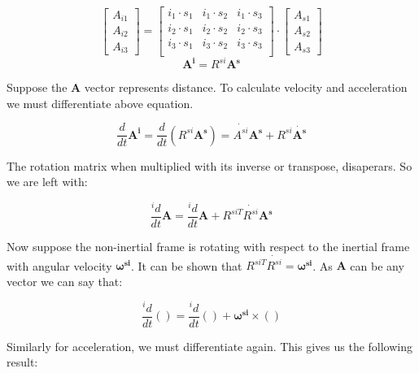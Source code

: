 \documentclass[12pt, letterpaper]{article}
\begin{document}
\begin{displaymath}
	\begin{bmatrix} A_{i1} \\ A_{i2} \\ A_{i3} \end{bmatrix} 
	=
	\begin{bmatrix}
	i_{1} \cdot s_{1} & i_{1} \cdot s_{2} & i_{1} \cdot s_{3}\\
	i_{2} \cdot s_{1} & i_{2} \cdot s_{2} & i_{2} \cdot s_{3}\\
	i_{3} \cdot s_{1} & i_{3} \cdot s_{2} & i_{3} \cdot s_{3}\\
	\end{bmatrix}
	\cdot
	\begin{bmatrix}
	A_{s1} \\ A_{s2} \\ A_{s3}
	\end{bmatrix}
\end{displaymath}
\begin{displaymath}	\mathbf{A^i} = R^{si}\mathbf{A^s} \end{displaymath}

Suppose the $\mathbf{A}$ vector represents distance. To calculate velocity and acceleration we must differentiate above equation. 

\begin{displaymath}
\frac{d}{dt}\mathbf{A^i} = \frac{d}{dt}(R^{si}\mathbf{A^s}) = \Dot{A^{si}}\mathbf{A^s} + R^{si}\Dot{\mathbf{A^s}}
\end{displaymath}

The rotation matrix when multiplied with its inverse or transpose, disaperars. So we are left with:

\begin{displaymath}
\frac{{}^id}{dt}\mathbf{A} = \frac{{}^id}{dt}\mathbf{A} + R^{siT}\Dot{R^{si}}\mathbf{A^s}
\end{displaymath}

Now suppose the non-inertial frame is rotating with respect to the inertial frame with angular velocity $\mathbf{\omega^{si}}$. It can be shown that $R^{siT}\Dot{R^{si}} = \mathbf{\omega^{si}}$. As $\mathbf{A}$ can be any vector we can say that: 

\begin{displaymath}
\frac{{}^id}{dt}( ) = \frac{{}^id}{dt}( ) + \mathbf{\omega^{si}}\times()
\end{displaymath}

Similarly for acceleration, we must differentiate again. This gives us the following result:
\end{document}
